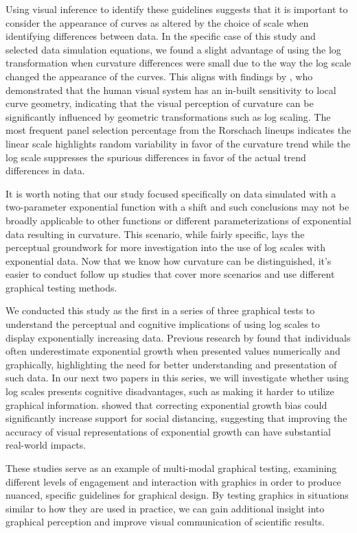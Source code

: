 \documentclass[12pt]{article}
\begin{document}
Using visual inference to identify these guidelines suggests that it is
important to consider the appearance of curves as altered by the choice
of scale when identifying differences between data. In the specific case
of this study and selected data simulation equations, we found a slight
advantage of using the log transformation when curvature differences
were small due to the way the log scale changed the appearance of the
curves. This aligns with findings by \citet{dresp20152d}, who
demonstrated that the human visual system has an in-built sensitivity to
local curve geometry, indicating that the visual perception of curvature
can be significantly influenced by geometric transformations such as log
scaling. The most frequent panel selection percentage from the Rorschach
lineups indicates the linear scale highlights random variability in
favor of the curvature trend while the log scale suppresses the spurious
differences in favor of the actual trend differences in data.

It is worth noting that our study focused specifically on data simulated
with a two-parameter exponential function with a shift and such
conclusions may not be broadly applicable to other functions or
different parameterizations of exponential data resulting in curvature.
This scenario, while fairly specific, lays the perceptual groundwork for
more investigation into the use of log scales with exponential data. Now
that we know how curvature can be distinguished, it's easier to conduct
follow up studies that cover more scenarios and use different graphical
testing methods.

We conducted this study as the first in a series of three graphical
tests to understand the perceptual and cognitive implications of using
log scales to display exponentially increasing data. Previous research
by \citet{ciccione2022analyzing} found that individuals often
underestimate exponential growth when presented values numerically and
graphically, highlighting the need for better understanding and
presentation of such data. In our next two papers in this series, we
will investigate whether using log scales presents cognitive
disadvantages, such as making it harder to utilize graphical
information. \citet{lammers2020correcting} showed that correcting
exponential growth bias could significantly increase support for social
distancing, suggesting that improving the accuracy of visual
representations of exponential growth can have substantial real-world
impacts.

These studies serve as an example of multi-modal graphical testing,
examining different levels of engagement and interaction with graphics
in order to produce nuanced, specific guidelines for graphical design.
By testing graphics in situations similar to how they are used in
practice, we can gain additional insight into graphical perception and
improve visual communication of scientific results.
\end{document}
